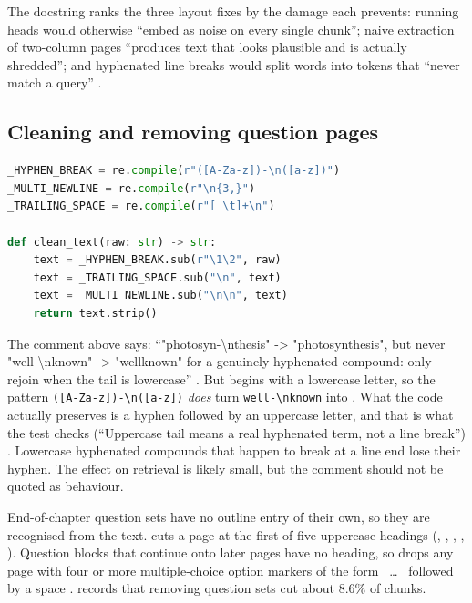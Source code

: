 The docstring ranks the three layout fixes by the damage each prevents: running heads would otherwise \enquote{embed as noise on every single chunk}; naive extraction of two-column pages \enquote{produces text that looks plausible and is actually shredded}; and hyphenated line breaks would split words into tokens that \enquote{never match a query} .

\subsection{Cleaning and removing question pages}

\begin{lstlisting}[language=Python]
_HYPHEN_BREAK = re.compile(r"([A-Za-z])-\n([a-z])")
_MULTI_NEWLINE = re.compile(r"\n{3,}")
_TRAILING_SPACE = re.compile(r"[ \t]+\n")

def clean_text(raw: str) -> str:
    text = _HYPHEN_BREAK.sub(r"\1\2", raw)
    text = _TRAILING_SPACE.sub("\n", text)
    text = _MULTI_NEWLINE.sub("\n\n", text)
    return text.strip()
\end{lstlisting}

\begin{finding}
The comment above  says: \enquote{"photosyn-\textbackslash nthesis" -> "photosynthesis", but never "well-\textbackslash nknown" -> "wellknown" for a genuinely hyphenated compound: only rejoin when the tail is lowercase} . But  begins with a lowercase letter, so the pattern \lstinline~([A-Za-z])-\n([a-z])~ \emph{does} turn \lstinline~well-\nknown~ into . What the code actually preserves is a hyphen followed by an uppercase letter, and that is what the test checks (\enquote{Uppercase tail means a real hyphenated term, not a line break}) . Lowercase hyphenated compounds that happen to break at a line end lose their hyphen. The effect on retrieval is likely small, but the comment should not be quoted as behaviour.
\end{finding}

End-of-chapter question sets have no outline entry of their own, so they are recognised from the text.  cuts a page at the first of five uppercase headings (, , , , ). Question blocks that continue onto later pages have no heading, so  drops any page with four or more multiple-choice option markers of the form ~\ldots~ followed by a space .  records that removing question sets cut about 8.6\% of chunks.

